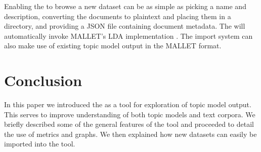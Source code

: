 \documentclass[11pt]{article}
\begin{document}
Enabling the \tool{} to browse a new dataset can be as simple as picking a name and description,
converting the documents to plaintext and placing them in a directory, and
providing a JSON file containing document metadata. The \tool{} will automatically
invoke MALLET's LDA implementation \cite{McCallum2002}. The import system can
also make use of existing topic model output in the MALLET format.

\section{Conclusion}
In this paper we introduced the \tool{} as a tool for exploration of
topic model output. This serves to improve understanding of both topic models
and text corpora. We briefly described some of the general features of the tool
and proceeded to detail the use of metrics and graphs. We then explained how
new datasets can easily be imported into the tool.



\end{document}
